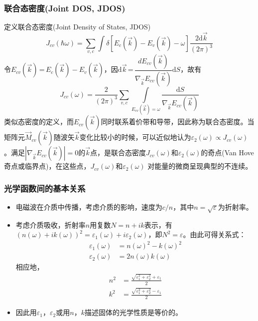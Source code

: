 \documentclass[cjk,slidestop,compress,mathserif,blue]{beamer}
\begin{document}
\frame
{
\frametitle{联合态密度(Joint DOS, JDOS)}
定义联合态密度(\textrm{Joint Density of States, JDOS})
\begin{displaymath}
  J_{cv}(\hbar\omega)=\sum_{v,c}\int\delta[E_c(\vec k)-E_v(\vec k)-\omega]\frac{2\textrm{d}\vec k}{(2\pi)^3}
  \label{eq:optic-33}
\end{displaymath}
\footnotesize{令$E_{cv}(\vec k)$\,=\,$E_c(\vec k)-E_v(\vec k)$，因$\textrm{d}\vec k$\,=\,$\dfrac{dE_{cv}(\vec k)}{\nabla_{\vec k}E_{cv}(\vec k)}\textrm{d}S$，故有
\begin{displaymath}
  J_{cv}(\omega)=\frac2{(2\pi)^3}\sum_{v,c}\int\limits_{E_{cv}(\vec k)=\omega}\frac{\textrm{d}S}{\nabla_{\vec k}E_{cv}(\vec k)}
  \label{eq:optic-34}
\end{displaymath}
类似态密度的定义，而$E_{cv}(\vec k)$同时联系着价带和导带，因此称为联合态密度。当矩阵元$\vec M_{cv}(\vec k)$随波矢$\vec k$变化比较小的时候，可以近似地认为$\varepsilon_2(\omega)\!\propto\!J_{cv}(\omega)$。满足$|\nabla_{\vec k}E_{cv}(\vec k)|\!=\!0$的$\vec k$点，是联合态密度$J_{cv}(\omega)$和$\varepsilon_2(\omega)$的奇点(\textrm{Van Hove}奇点或临界点)，在这些点，$J_{cv}(\omega)$和$\varepsilon_2(\omega)$%
对能量的微商呈现典型的不连续。%
}}

\frame
{
\frametitle{光学函数间的基本关系}
\begin{itemize}
	\item 电磁波在介质中传播，考虑介质的影响，速度为$c/n$，其中$n=\sqrt\varepsilon$为折射率。%
	\item 考虑介质吸收，折射率$n$用复数$N=n+ik$表示，有$(n(\omega)+ik(\omega))^2=\varepsilon_1(\omega)+i\varepsilon_2(\omega)$，即$N^2=\varepsilon$。由此可得关系式：
\begin{displaymath}
\begin{aligned}
   \varepsilon_1(\omega)&=n(\omega)^2-k(\omega)^2\\
   \varepsilon_2(\omega)&=2n(\omega)k(\omega)
 \end{aligned}%
  \label{eq:optic-9}
\end{displaymath}
相应地，
\begin{displaymath}
\begin{aligned}
   n^2&=\frac{\sqrt{\varepsilon_1^2+\varepsilon_2^2}+\varepsilon_1}2\\
   k^2&=\frac{\sqrt{\varepsilon_1^2+\varepsilon_2^2}-\varepsilon_1}2
   \end{aligned}%
  \label{eq:optic-10}
\end{displaymath}
	\item 因此用$\varepsilon_1$，$\varepsilon_2$或用$n$，$k$描述固体的光学性质是等价的。
\end{itemize}
}
\end{document}
